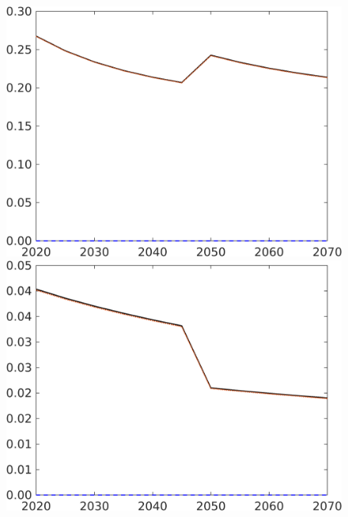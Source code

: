 \begin{figure}[h!!]
\begin{minipage}[]{0.32\textwidth}
\end{minipage}
\begin{minipage}[]{0.32\textwidth}
	\includegraphics[width=1\textwidth]{../../codding_model/own_basedOnFried/optimalPol_190722_tidiedUp/figures/all_10Aout22/CountMod1_target_sg_regime3_spillover0_sep1_extern0_PV1_etaa0.79_lgd0.png}
\end{minipage}
\begin{minipage}[]{0.32\textwidth}
	\includegraphics[width=1\textwidth]{../../codding_model/own_basedOnFried/optimalPol_190722_tidiedUp/figures/all_10Aout22/CountMod1_target_sff_regime3_spillover0_sep1_extern0_PV1_etaa0.79_lgd0.png}

\end{minipage}
\end{figure}
